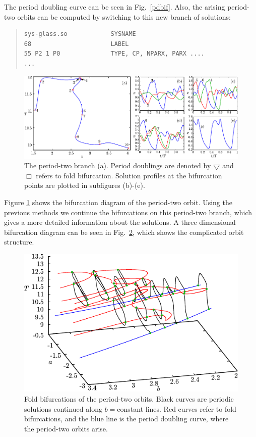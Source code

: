 \documentclass[10pt,a4paper]{ddedoc}
\begin{document}
The period doubling curve can be seen in Fig.\ \ref{pdbif}.
Also, the arising period-two orbits can be computed by switching to this new
branch of solutions:
{ \small \begin{quote} \begin{lstlisting}[basicstyle=\tt,frame=single]
sys-glass.so            SYSNAME
68                      LABEL
55 P2 1 P0              TYPE, CP, NPARX, PARX ....
...
\end{lstlisting} \end{quote} } \noindent
%
\begin{figure}[t!]
\begin{center}
\includegraphics{fig/plot-pdsw}
\end{center}
\caption{The period-two branch (a). Period doublings are denoted by $\bigtriangledown$ and
$\Box$ refers to fold bifurcation. Solution profiles at the bifurcation points are plotted in subfigures (b)-(e).}
\label{pdsw}
\end{figure}
Figure \ref{pdsw} shows the bifurcation diagram of the period-two orbit. Using the
previous methods we continue the bifurcations on this period-two branch, which
gives a more detailed information about the solutions. A three dimensional
bifurcation diagram can be seen in Fig.\ \ref{pdfold}, which shows the
complicated orbit structure.
\begin{figure}[t!]
\begin{center}
\includegraphics{fig/plot-lp3d}
\end{center}
\caption{Fold bifurcations of the period-two orbits. Black curves are periodic
solutions continued along $b=$constant lines. Red curves refer to fold
bifurcations, and the blue line is the period doubling curve, where the
period-two orbits arise. }
\label{pdfold}
\end{figure}
\end{document}

